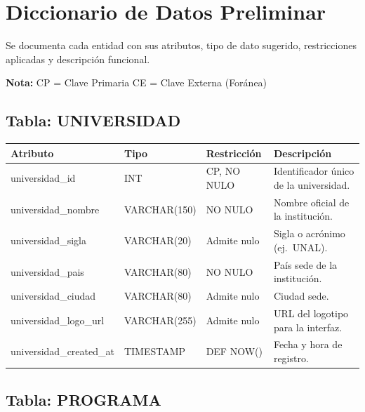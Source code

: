 \documentclass[12pt, letterpaper, twoside]{article}
\begin{document}
\section{Diccionario de Datos Preliminar}
\label{sec:diccionario}

Se documenta cada entidad con sus atributos, tipo de dato sugerido,
restricciones aplicadas y descripción funcional.

\medskip
\noindent\textbf{Nota:} CP = Clave Primaria \quad CE = Clave Externa (Foránea)

\subsection{Tabla: UNIVERSIDAD}

\begin{center}
\begin{tabular}{p{4cm} p{2.8cm} p{2.8cm} p{4cm}}
\toprule
\textbf{Atributo} & \textbf{Tipo} & \textbf{Restricción} & \textbf{Descripción} \\
\midrule
universidad\_id          & INT            & CP, NO NULO   & Identificador único de la universidad. \\
universidad\_nombre      & VARCHAR(150)   & NO NULO       & Nombre oficial de la institución. \\
universidad\_sigla       & VARCHAR(20)    & Admite nulo   & Sigla o acrónimo (ej.\ UNAL). \\
universidad\_pais        & VARCHAR(80)    & NO NULO       & País sede de la institución. \\
universidad\_ciudad      & VARCHAR(80)    & Admite nulo   & Ciudad sede. \\
universidad\_logo\_url   & VARCHAR(255)   & Admite nulo   & URL del logotipo para la interfaz. \\
universidad\_created\_at & TIMESTAMP      & DEF NOW()     & Fecha y hora de registro. \\
\bottomrule
\end{tabular}
\end{center}

\subsection{Tabla: PROGRAMA}
\end{document}
